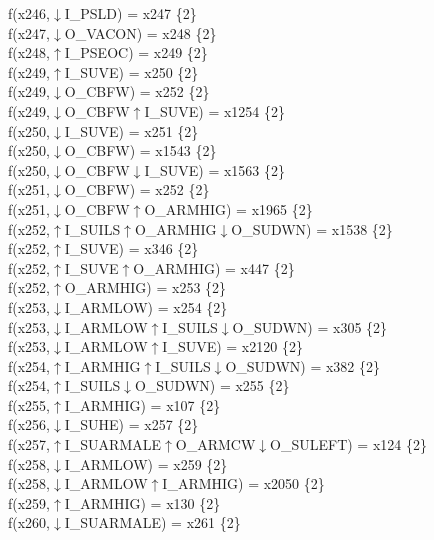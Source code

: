 f(x246,$\downarrow$I\_PSLD) = x247 \{2\} \\  
f(x247,$\downarrow$O\_VACON) = x248 \{2\} \\  
f(x248,$\uparrow$I\_PSEOC) = x249 \{2\} \\  
f(x249,$\uparrow$I\_SUVE) = x250 \{2\} \\  
f(x249,$\downarrow$O\_CBFW) = x252 \{2\} \\  
f(x249,$\downarrow$O\_CBFW$\uparrow$I\_SUVE) = x1254 \{2\} \\  
f(x250,$\downarrow$I\_SUVE) = x251 \{2\} \\  
f(x250,$\downarrow$O\_CBFW) = x1543 \{2\} \\  
f(x250,$\downarrow$O\_CBFW$\downarrow$I\_SUVE) = x1563 \{2\} \\  
f(x251,$\downarrow$O\_CBFW) = x252 \{2\} \\  
f(x251,$\downarrow$O\_CBFW$\uparrow$O\_ARMHIG) = x1965 \{2\} \\  
f(x252,$\uparrow$I\_SUILS$\uparrow$O\_ARMHIG$\downarrow$O\_SUDWN) = x1538 \{2\} \\  
f(x252,$\uparrow$I\_SUVE) = x346 \{2\} \\  
f(x252,$\uparrow$I\_SUVE$\uparrow$O\_ARMHIG) = x447 \{2\} \\  
f(x252,$\uparrow$O\_ARMHIG) = x253 \{2\} \\  
f(x253,$\downarrow$I\_ARMLOW) = x254 \{2\} \\  
f(x253,$\downarrow$I\_ARMLOW$\uparrow$I\_SUILS$\downarrow$O\_SUDWN) = x305 \{2\} \\  
f(x253,$\downarrow$I\_ARMLOW$\uparrow$I\_SUVE) = x2120 \{2\} \\  
f(x254,$\uparrow$I\_ARMHIG$\uparrow$I\_SUILS$\downarrow$O\_SUDWN) = x382 \{2\} \\  
f(x254,$\uparrow$I\_SUILS$\downarrow$O\_SUDWN) = x255 \{2\} \\  
f(x255,$\uparrow$I\_ARMHIG) = x107 \{2\} \\  
f(x256,$\downarrow$I\_SUHE) = x257 \{2\} \\  
f(x257,$\uparrow$I\_SUARMALE$\uparrow$O\_ARMCW$\downarrow$O\_SULEFT) = x124 \{2\} \\  
f(x258,$\downarrow$I\_ARMLOW) = x259 \{2\} \\  
f(x258,$\downarrow$I\_ARMLOW$\uparrow$I\_ARMHIG) = x2050 \{2\} \\  
f(x259,$\uparrow$I\_ARMHIG) = x130 \{2\} \\  
f(x260,$\downarrow$I\_SUARMALE) = x261 \{2\} \\  
